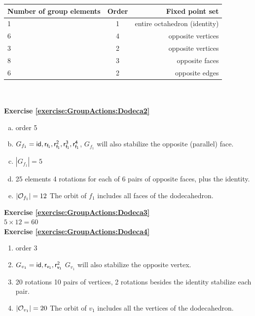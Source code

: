 \begin{tabular}{| l | c | r |} \hline
\textbf{ Number of group elements} & \textbf{Order} & \textbf{Fixed point set} \\ \hline
1 & 1 & entire octahedron (identity) \\ \hline
6 & 4  & opposite vertices\\ \hline
3 & 2 & opposite vertices\\ \hline
8 & 3 & opposite faces  \\ \hline
6 & 2 & opposite edges \\ \hline
\end{tabular}
\\
\\

\noindent\textbf{Exercise \ref{exercise:GroupActions:Dodeca2}}
\begin{enumerate}[(a)]
\item 
order 5

\item
$G_{f_1}={\sf{id},r_{f_1},r_{f_1}^2, r_{f_1}^3, r_{f_1}^4}$, $G_{f_1}$ will also stabilize the opposite (parallel) face.

\item 
$|G_{f_1}|=5$

\item 
25 elements 4 rotations for each of 6 pairs of opposite faces, plus the identity.

\item
$|{\cal O}_{f_1}|=12$ The orbit of $f_1$ includes all faces of the dodecahedron.
\end{enumerate}

\noindent\textbf{Exercise \ref{exercise:GroupActions:Dodeca3}}
\\
$5\times 12=60$
\\

\noindent\textbf{Exercise \ref{exercise:GroupActions:Dodeca4}}
\begin{enumerate} 
\item
order 3

\item 
$G_{v_1}={\sf{id},r_{v_1},r_{v_1}^2}$ $G_{v_1}$ will also stabilize the opposite vertex.

\item
20 rotations 10 pairs of vertices, 2 rotations besides the identity stabilize each pair.

\item
$|{\cal O}_{v_1}|=20$ The orbit of $v_1$ includes all the vertices of the dodecahedron.
\end{enumerate}


